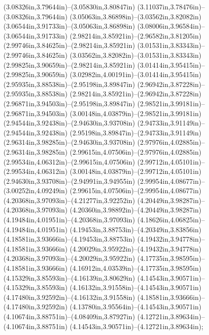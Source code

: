 (3.08326in,3.79644in)--(3.05830in,3.80847in) (3.11037in,3.78476in)--(3.08326in,3.79644in) (3.05063in,3.86898in)--(3.03562in,3.82082in) (3.06544in,3.91733in)--(3.05063in,3.86898in) (3.08006in,3.96584in)--(3.06544in,3.91733in) (2.98214in,3.85921in)--(2.96582in,3.81205in) (2.99746in,3.84625in)--(2.98214in,3.85921in) (3.01531in,3.83343in)--(2.99746in,3.84625in) (3.03562in,3.82082in)--(3.01531in,3.83343in) (2.99825in,3.90659in)--(2.98214in,3.85921in) (3.01414in,3.95415in)--(2.99825in,3.90659in) (3.02982in,4.00191in)--(3.01414in,3.95415in) (2.95935in,3.88538in)--(2.95198in,3.89847in) (2.96942in,3.87228in)--(2.95935in,3.88538in) (2.98214in,3.85921in)--(2.96942in,3.87228in) (2.96871in,3.94503in)--(2.95198in,3.89847in) (2.98521in,3.99181in)--(2.96871in,3.94503in) (3.00148in,4.03879in)--(2.98521in,3.99181in) (2.94544in,3.92438in)--(2.94630in,3.93708in) (2.94733in,3.91149in)--(2.94544in,3.92438in) (2.95198in,3.89847in)--(2.94733in,3.91149in) (2.96314in,3.98285in)--(2.94630in,3.93708in) (2.97976in,4.02885in)--(2.96314in,3.98285in) (2.99615in,4.07506in)--(2.97976in,4.02885in) (2.99534in,4.06312in)--(2.99615in,4.07506in) (2.99712in,4.05101in)--(2.99534in,4.06312in) (3.00148in,4.03879in)--(2.99712in,4.05101in) (2.94630in,3.93708in)--(2.94991in,3.94955in) (2.99954in,4.08677in)--(3.00252in,4.09249in) (2.99615in,4.07506in)--(2.99954in,4.08677in) (4.20368in,3.97093in)--(4.21277in,3.92252in) (4.20449in,3.98287in)--(4.20368in,3.97093in) (4.20360in,3.98892in)--(4.20449in,3.98287in) (4.19484in,4.01951in)--(4.20368in,3.97093in) (4.18626in,4.06825in)--(4.19484in,4.01951in) (4.19453in,3.88753in)--(4.20349in,3.83856in) (4.18581in,3.93666in)--(4.19453in,3.88753in) (4.19432in,3.94778in)--(4.18581in,3.93666in) (4.20029in,3.95922in)--(4.19432in,3.94778in) (4.20368in,3.97093in)--(4.20029in,3.95922in) (4.17735in,3.98595in)--(4.18581in,3.93666in) (4.16912in,4.03539in)--(4.17735in,3.98595in) (4.15329in,3.85593in)--(4.16139in,3.80629in) (4.14543in,3.90571in)--(4.15329in,3.85593in) (4.16132in,3.91558in)--(4.14543in,3.90571in) (4.17480in,3.92592in)--(4.16132in,3.91558in) (4.18581in,3.93666in)--(4.17480in,3.92592in) (4.13780in,3.95564in)--(4.14543in,3.90571in) (4.10674in,3.88751in)--(4.08409in,3.87927in) (4.12721in,3.89634in)--(4.10674in,3.88751in) (4.14543in,3.90571in)--(4.12721in,3.89634in);
